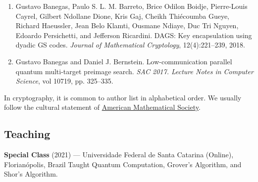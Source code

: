 \begin{enumerate}
\item Gustavo Banegas, Paulo S. L. M. Barreto, Brice Odilon Boidje, Pierre-Louis Cayrel, Gilbert Ndollane Dione, Kris Gaj, Cheikh Thiécoumba Gueye, Richard Haeussler, Jean Belo Klamti, Ousmane Ndiaye, Duc Tri Nguyen, Edoardo Persichetti, and Jefferson Ricardini. DAGS: Key encapsulation using dyadic GS codes. \textit{Journal of Mathematical Cryptology}, 12(4):221–239, 2018.
\item Gustavo Banegas and Daniel J. Bernstein. Low-communication parallel quantum multi-target preimage search. \textit{SAC 2017. Lecture Notes in Computer Science}, vol 10719, pp. 325–335.
\end{enumerate}
In cryptography, it is common to author list in alphabetical order. We usually follow the cultural statement of \href{https://www.ams.org/profession/leaders/CultureStatement04.pdf}{American Mathematical Society}. 

\subsection*{Teaching}
\textbf{Special Class} (2021) — Universidade Federal de Santa Catarina (Online), Florianópolis, Brazil  
Taught Quantum Computation, Grover's Algorithm, and Shor's Algorithm. ~\\

